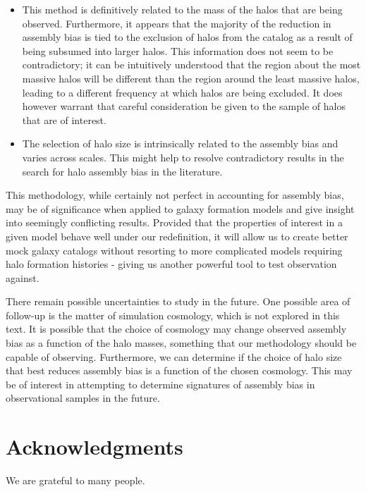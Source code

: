 \documentclass[usenatbib,usegraphicx,letterpaper]{mn2e}
\begin{document}
\begin{itemize}
	\item This method is definitively related to the mass of the halos that are being observed. Furthermore, it
appears that the majority of the reduction in assembly bias is tied to the exclusion of halos from the catalog as
a result of being subsumed into larger halos. This information does not seem to be contradictory; it can be
intuitively understood that the region about the most massive halos will be different than the region around the
least massive halos, leading to a different frequency at which halos are being excluded. It does however warrant
that careful consideration be given to the sample of halos that are of interest.

	\item The selection of halo size is intrinsically related to the assembly bias and varies across scales. This
might help to resolve contradictory results in the search for halo assembly bias in the literature.
\end{itemize}

This methodology, while certainly not perfect in accounting for assembly bias, may be of significance when
applied to galaxy formation models and give insight into seemingly conflicting results. Provided that the
properties of interest in a given model behave well under our redefinition, it will allow us to create better
mock galaxy catalogs without resorting to more complicated models requiring halo formation histories - giving us
another powerful tool to test observation against.

There remain possible uncertainties to study in the future. One possible area of follow-up is the matter of
simulation cosmology, which is not explored in this text. It is possible that the choice of cosmology may change
observed assembly bias as a function of the halo masses, something that our methodology should be capable of
observing. Furthermore, we can determine if the choice of halo size that best reduces assembly bias is a function
of the chosen cosmology. This may be of interest in attempting to determine signatures of assembly bias in
observational samples in the future.

\section*{Acknowledgments}

We are grateful to many people.


\end{document}
